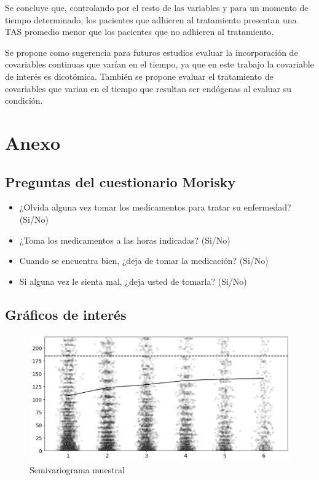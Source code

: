 \documentclass[spanish]{article}
\numberwithin{figure}{subsection}
\numberwithin{equation}{subsection}
\numberwithin{table}{subsection}
\begin{document}
Se concluye que, controlando por el resto de las variables y para un momento de
tiempo determinado, los pacientes que adhieren al tratamiento presentan una TAS
promedio menor que los pacientes que no adhieren al tratamiento.

Se propone como sugerencia para futuros estudios evaluar la incorporación de
covariables continuas que varían en el tiempo, ya que en este trabajo la
covariable de interés es dicotómica. También se propone evaluar el tratamiento
de covariables que varian en el tiempo que resultan ser endógenas al evaluar su
condición.

\newpage

\section{Anexo}

\subsection{Preguntas del cuestionario Morisky}

\begin{itemize}
	\item ¿Olvida alguna vez tomar los medicamentos para tratar su enfermedad?
	(Si/No)
	\item ¿Toma los medicamentos a las horas indicadas? (Si/No)
	\item Cuando se encuentra bien, ¿deja de tomar la medicación? (Si/No)
	\item Si alguna vez le sienta mal, ¿deja usted de tomarla? (Si/No)
\end{itemize}

\subsection{Gráficos de interés}

\begin{figure}[H]
	\centering
	\includegraphics[scale=0.4]{img/semivariogram.png}
	\caption{Semivariograma muestral}
	\label{semivariogram}
\end{figure}
\end{document}
